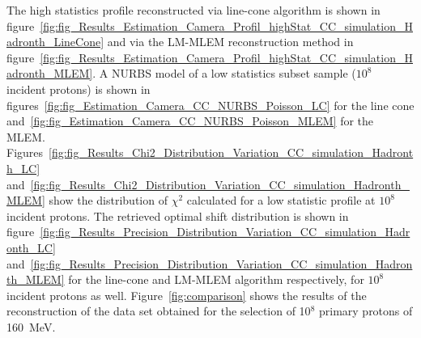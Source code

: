 The high statistics profile reconstructed via line-cone algorithm is shown in figure~\ref{fig:fig_Results_Estimation_Camera_Profil_highStat_CC_simulation_Hadronth_LineCone} and via the LM-MLEM reconstruction method in figure~\ref{fig:fig_Results_Estimation_Camera_Profil_highStat_CC_simulation_Hadronth_MLEM}. A NURBS model of a low statistics subset sample ($10^8$ incident protons) is shown in figures~\ref{fig:fig_Estimation_Camera_CC_NURBS_Poisson_LC} for the line cone and~\ref{fig:fig_Estimation_Camera_CC_NURBS_Poisson_MLEM} for the MLEM.
Figures~\ref{fig:fig_Results_Chi2_Distribution_Variation_CC_simulation_Hadronth_LC} and~\ref{fig:fig_Results_Chi2_Distribution_Variation_CC_simulation_Hadronth_MLEM} show the distribution of $\chi^2$ calculated for a low statistic profile at $10^8$ incident protons. The retrieved optimal shift distribution is shown in figure~\ref{fig:fig_Results_Precision_Distribution_Variation_CC_simulation_Hadronth_LC} and~\ref{fig:fig_Results_Precision_Distribution_Variation_CC_simulation_Hadronth_MLEM} for the line-cone and LM-MLEM algorithm respectively, for $10^8$ incident protons as well.
Figure~\ref{fig:comparison} shows the results of the reconstruction of the data set obtained for the selection of 10$^8$ primary protons of 160~MeV.



